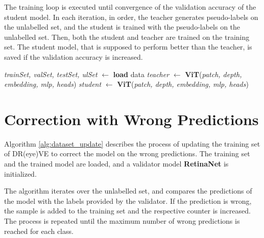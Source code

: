 \begin{appendices}
    The training loop is executed until convergence of the validation accuracy 
    of the student model. In each iteration, in order, the teacher generates 
    pseudo-labels on the unlabelled set, and the student is trained with the 
    pseudo-labels on the unlabelled set. Then, both the student and teacher 
    are trained on the training set. The student model, that is supposed to 
    perform better than the teacher, is saved if the validation accuracy is 
    increased.
    \begin{algorithm}
        \vspace{0.2cm}
        \DontPrintSemicolon
        \textit{trainSet, valSet, testSet, ulSet} $\gets$ \textbf{load} data\;
        \textit{teacher} $\gets$ \textbf{ViT}(\textit{patch, depth, embedding, mlp, heads})\;
        \textit{student} $\gets$ \textbf{ViT}(\textit{patch, depth, embedding, mlp, heads})\;
    \end{algorithm}
    \section{Correction with Wrong Predictions}
    Algorithm \ref{alg:dataset_update} describes the process of updating the 
    training set of DR(eye)VE to correct the model on the wrong predictions.
    The training set and the trained model are loaded, and a validator model 
    \textbf{RetinaNet} is initialized. 
    
    The algorithm iterates over the unlabelled 
    set, and compares the predictions of the model with the labels provided by 
    the validator. If the prediction is wrong, the sample is added to the training 
    set and the respective counter is increased. The process is repeated until 
    the maximum number of wrong predictions is reached for each class.


\end{appendices}
